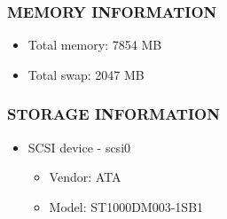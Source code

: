 \documentclass[a4paper]{report}
\begin{document}
\subsubsection{MEMORY INFORMATION}
\begin{itemize}
\item Total memory: 7854 MB
\item Total swap: 2047 MB
\end{itemize}
\subsubsection{STORAGE INFORMATION}
\begin{itemize}
\item SCSI device -  scsi0 \begin{itemize}
\item Vendor:  ATA
\item Model:  ST1000DM003-1SB1 
\end{itemize}
\end{itemize}
\end{document}
